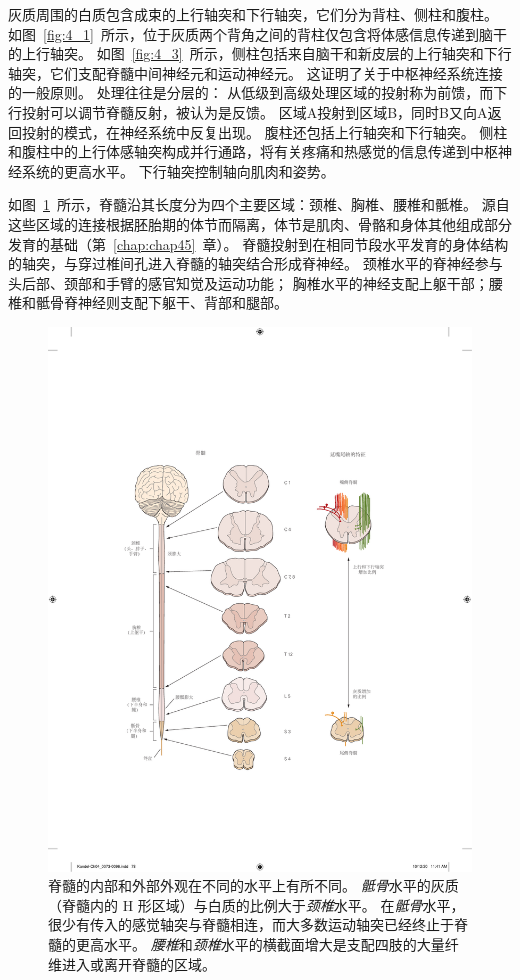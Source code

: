 灰质周围的白质包含成束的上行轴突和下行轴突，它们分为背柱、侧柱和腹柱。
如图~\ref{fig:4_1}~所示，位于灰质两个背角之间的背柱仅包含将体感信息传递到脑干的上行轴突。
如图~\ref{fig:4_3}~所示，侧柱包括来自脑干和新皮层的上行轴突和下行轴突，它们支配脊髓中间神经元和运动神经元。
这证明了关于中枢神经系统连接的一般原则。
处理往往是分层的：
从低级到高级处理区域的投射称为前馈，而下行投射可以调节脊髓反射，被认为是反馈。 
区域A投射到区域B，同时B又向A返回投射的模式，在神经系统中反复出现。
腹柱还包括上行轴突和下行轴突。
侧柱和腹柱中的上行体感轴突构成并行通路，将有关疼痛和热感觉的信息传递到中枢神经系统的更高水平。
下行轴突控制轴向肌肉和姿势。


如图~\ref{fig:4_4}~所示，脊髓沿其长度分为四个主要区域：颈椎、胸椎、腰椎和骶椎。
源自这些区域的连接根据胚胎期的体节而隔离，体节是肌肉、骨骼和身体其他组成部分发育的基础（第~\ref{chap:chap45}~章）。
脊髓投射到在相同节段水平发育的身体结构的轴突，与穿过椎间孔进入脊髓的轴突结合形成脊神经。
颈椎水平的脊神经参与头后部、颈部和手臂的感官知觉及运动功能；
胸椎水平的神经支配上躯干部；腰椎和骶骨脊神经则支配下躯干、背部和腿部。


\begin{figure}[htbp]
	\centering
	\includegraphics[width=1.0\linewidth]{chap04/fig_4_4}
	\caption{脊髓的内部和外部外观在不同的水平上有所不同。
		\textit{骶骨}水平的灰质（脊髓内的 H 形区域）与白质的比例大于\textit{颈椎}水平。
		在\textit{骶骨}水平，很少有传入的感觉轴突与脊髓相连，而大多数运动轴突已经终止于脊髓的更高水平。
		\textit{腰椎}和\textit{颈椎}水平的横截面增大是支配四肢的大量纤维进入或离开脊髓的区域。}
	\label{fig:4_4}
\end{figure}


